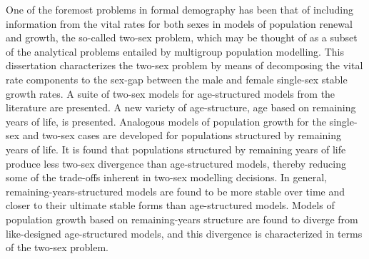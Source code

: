 
One of the foremost problems in formal demography has been that of including
information from the vital rates for both sexes in models of population renewal
and growth, the so-called two-sex problem, which may be thought of as a subset
of the analytical problems entailed by multigroup population modelling. This
dissertation characterizes the two-sex problem by means of decomposing the vital 
rate components to the sex-gap between the male and female single-sex stable growth
rates. A suite of two-sex models for age-structured models from the
literature are presented. A new variety of age-structure, age based on remaining
years of life, is presented. Analogous models of population growth for the
single-sex and two-sex cases are developed for populations structured by
remaining years of life. It is found that populations structured by remaining
years of life produce less two-sex divergence than age-structured models,
thereby reducing some of the trade-offs inherent in two-sex modelling decisions.
In general, remaining-years-structured models are found to be more stable over 
time and closer to their ultimate stable forms than age-structured models. Models of
population growth based on remaining-years structure are found to diverge from
like-designed age-structured models, and this divergence is characterized in
terms of the two-sex problem.
